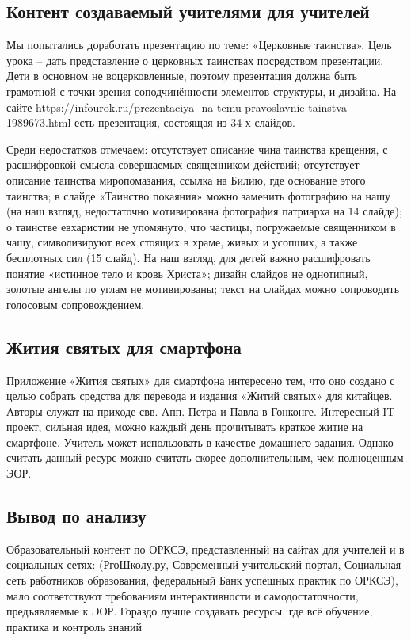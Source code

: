 \subsection{Контент создаваемый учителями для учителей}
Мы попытались доработать презентацию по теме: «Церковные таинства». Цель урока – дать представление о церковных таинствах посредством презентации. Дети в основном не воцерковленные, поэтому презентация должна быть грамотной с точки зрения соподчинённости элементов структуры, и дизайна. На сайте https://infourok.ru/prezentaciya- na-temu-pravoslavnie-tainstva-1989673.html есть презентация, состоящая из 34-х слайдов. 

Среди недостатков отмечаем:
отсутствует описание чина таинства крещения, с расшифровкой смысла совершаемых священником действий;
отсутствует описание таинства миропомазания, ссылка на Билию, где основание этого таинства;
в слайде «Таинство покаяния» можно заменить фотографию на нашу (на наш взгляд, недостаточно мотивирована фотография патриарха на 14 слайде);
о таинстве евхаристии не упомянуто, что частицы, погружаемые священником в чашу, символизируют всех стоящих в храме, живых и усопших, а также бесплотных сил (15 слайд). На наш взгляд, для детей важно расшифровать понятие «истинное тело и кровь Христа»;
дизайн слайдов не однотипный, золотые ангелы по углам не мотивированы;
текст на слайдах можно сопроводить голосовым сопровождением.


\subsection{Жития святых для смартфона}
Приложение «Жития святых» для смартфона интересено тем, что оно создано с целью собрать средства для перевода и издания «Житий святых» для китайцев. Авторы служат на приходе свв. Апп. Петра и Павла в Гонконге. Интересный IT проект, сильная идея, можно каждый день прочитывать краткое житие на смартфоне. Учитель может использовать в качестве домашнего задания. Однако считать данный ресурс можно считать скорее дополнительным, чем полноценным ЭОР.


\subsection{Вывод по анализу}
Образовательный контент по ОРКСЭ, представленный на сайтах для учителей и в социальных сетях: (РгоШколу.ру, Современный учительский портал, Социальная сеть работников образования, федеральный Банк успешных практик по ОРКСЭ), мало соответствуют требованиям интерактивности и самодостаточности, предъявляемые к ЭОР. 
Гораздо лучше создавать ресурсы, где всё обучение, практика и контроль знаний 



